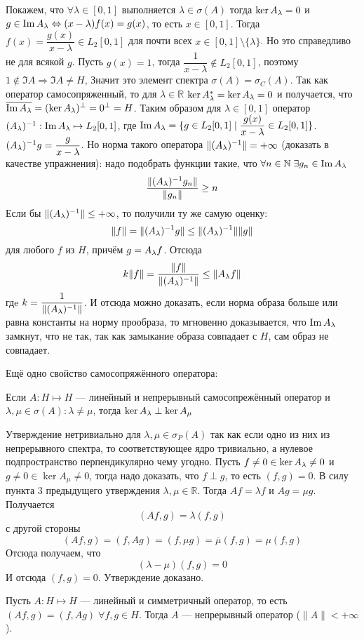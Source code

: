 \documentclass[14pt]{extarticle}
\begin{document}
\begin{Prim}
    Покажем, что $\forall \lambda \in [0,1]$ выполняется $\lambda \in 
    \sigma(A)$ тогда $\ker \Al = 0$ и $g \in \Im \Al 
    \Leftrightarrow (x - \lambda)f(x) = g(x)$, то есть $x \in [0,1]$.
    Тогда $f(x) = \dfrac{g(x)}{x - \lambda} \in L_2[0,1]$ для почти всех $x \in 
    [0, 1] \setminus \{\lambda\}$.
    Но это справедливо не для всякой $g$.
    Пусть $g(x) = 1$, тогда $\dfrac{1}{x - \lambda} \notin L_2[0,1]$, поэтому 
    $1 \notin \Im A \Rightarrow \Im A \ne H$, 
    Значит это элемент спектра $\sigma(A) = \sigma_C(A)$.
    Так как оператор самосопряженный, то для $\lambda \in \mathbb R$ $\ker 
    \Al^* = \ker \Al = 0$ и получается, что
    $\overline{\Im \Al} = (\ker \Al)^\perp = 0^\perp = H$. 
    Таким образом для $\lambda \in [0,1]$ оператор $\Alo : \Im \Al \mapsto 
    L_2[0,1]$, где $\Im \Al = \{g \in L_2[0,1] \mid
    \dfrac{g(x)}{x - \lambda} \in L_2[0,1]\}$. 
    $(A_\lambda)^{-1} g = \dfrac{g}{x - \lambda}$.
    Но норма такого оператора $\|(A_\lambda)^{-1}\| = +\infty$ (доказать в качестве 
    упражнения): надо подобрать функции такие, что
    $\forall n \in \mathbb N\; \exists g_n \in \Im \Al$
    $$
    \dfrac{\|(A_\lambda)^{-1} g_n\|}{\|g_n\|} \ge n
    $$
    Если бы $\|(A_\lambda)^{-1}\| \le +\infty$, то получили ту же самую оценку:
    $$
    \|f\| = \|(A_\lambda)^{-1} g\| \le \|(A_\lambda)^{-1}\| \|g\|
    $$
    для любого $f$ из $H$, причём $g = \Al f$.
    Отсюда
    $$
    k\|f\| = \dfrac{\|f\|}{\|\Alo\|} \le \|\Al f\|
    $$
    гдe $k = \dfrac{1}{\|(A_\lambda)^{-1}\|}$.
    И отсюда можно доказать, если норма образа больше или равна константы на 
    норму прообраза, то мгновенно
    доказывается, что $\Im \Al$ замкнут, что не так, так как замыкание образа 
    совпадает с $H$, сам образ не совпадает.
\end{Prim}

Ещё одно свойство самосопряжённого оператора:
\begin{Utv}
    Если $A : H \mapsto H$ --- линейный и непрерывный самосопрежённый оператор 
    и $\lambda, \mu \in \sigma(A)\colon
    \lambda \ne \mu$, тогда $\ker \Al \perp \ker A_\mu$
\end{Utv}
\begin{Proof}
    Утверждение нетривиально для $\lambda, \mu \in \sigma_P(A)$ так как если 
    одно из них из непрерывного спектра, то
    соответствующее ядро тривиально, а нулевое подпространство перпендикулярно 
    чему угодно.
    Пусть $f \ne 0 \in \ker \Al \ne 0$ и $g \ne 0 \in \ker A_\mu \ne 0$, тогда 
    надо доказать, что $f \perp g$, то есть $(f, g) = 0$.
    В силу пункта 3 предыдущего утверждения $\lambda, \mu \in \mathbb R$.
    Тогда $A f = \lambda f$ и $A g = \mu g$.
    Получается
    $$
    (Af, g) = \lambda (f, g)
    $$
    с другой стороны
    $$
    (Af, g) = (f, Ag) = (f, \mu g) = \overline{\mu}(f, g) = \mu (f, g)
    $$
    Отсюда получаем, что
    $$
    (\lambda - \mu)(f, g) = 0
    $$
    И отсюда $(f, g) = 0$.
    Утверждение доказано.
\end{Proof}
\begin{Upr}
    Пусть $A : H \mapsto H$ --- линейный и симметричный оператор, то есть $(Af 
    ,g) = (f, Ag)\; \forall f,g \in H$.
    Тогда $A$ --- непрерывный оператор ($\|A\| < +\infty$).
\end{Upr}
\end{document}
